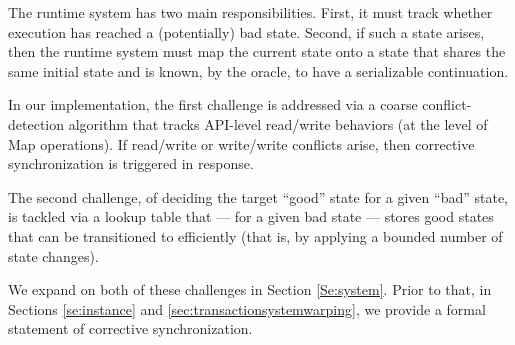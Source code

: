 The runtime system has two main responsibilities. First, it must track whether execution has reached a (potentially) bad state. Second, if such a state arises, then the runtime system must map the current state onto a state that shares the same initial state and is known, by the oracle, to have a serializable continuation. 

In our implementation, the first challenge is addressed via a coarse conflict-detection algorithm that tracks API-level read/write behaviors (at the level of {\sf Map} operations). If read/write or write/write conflicts arise, then corrective synchronization is triggered in response. 

The second challenge, of deciding the target ``good'' state for a given ``bad'' state, is tackled via a lookup table that --- for a given bad state --- stores good states that can be transitioned to efficiently (that is, by applying a bounded number of state changes).

We expand on both of these challenges in Section \ref{Se:system}. Prior to that, in Sections \ref{se:instance} and \ref{sec:transactionsystemwarping}, we provide a formal statement of corrective synchronization.